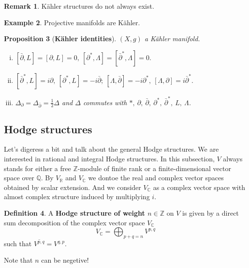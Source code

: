 \documentclass{article}
\theoremstyle{definition}
\newtheorem{definition}{Definition}[subsection]
\newtheorem{example}[definition]{Example}
\newtheorem{remark}[definition]{Remark}
\theoremstyle{plain}
\newtheorem{proposition}[definition]{Proposition}
\begin{document}
\begin{remark}
    K\"{a}hler structures do not always exist.
\end{remark}

\begin{example}
    Projective manifolds are K\"{a}hler.
\end{example}

\begin{proposition}[\textbf{K\"{a}hler identities}]
    $ (X,g) $ a K\"{a}hler manifold.\begin{enumerate}[(i)]
        \item $ [\bar{\partial},L]=[\partial,L]=0,\ [\partial^*,\varLambda]=[\bar{\partial}^*,\varLambda]=0. $
        \item $ [\bar{\partial}^*,L]=i\partial,\ [\partial^*,L]=-i\bar{\partial};\ [\varLambda,\bar{\partial}]=-i\partial^*,\ [\varLambda,\partial]=i\bar{\partial}^*. $
        \item $ \varDelta_{\partial}=\varDelta_{\bar{\partial}}=\frac{1}{2}\varDelta $ and $ \varDelta $ commutes with $ *,\ \partial,\ \bar{\partial},\ \partial^*,\ \bar{\partial}^*,\ L,\ \varLambda $.
    \end{enumerate}
\end{proposition}

\subsection{Hodge structures}

Let's digeress a bit and talk about the general Hodge structures. We are interested in rational and integral Hodge structures. In this subsection, $ V $ always stands for either a free $ \mathbb{Z} $-module of finite rank or a finite-dimensional vector space over $ \mathbb{Q} $. By $ V_{\mathbb{R}} $ and $ V_{\mathbb{C}} $ we dontoe the real and complex vector spaces obtained by scalar extension. And we consider $ V_{\mathbb{C}} $ as a complex vector space with almost complex structure induced by multiplying $ i $.

\begin{definition}
    A \textbf{Hodge structure of weight $ n\in \mathbb{Z} $} on $ V $ is given by a direct sum decomposition of the complex vector space $ V_{\mathbb{C}} $\[
        V_{\mathbb{C}}=\bigoplus_{p+q=n}V^{p,q}
    \]such that $ \overline{V^{p,q}}=V^{q,p} $.
\end{definition}

Note that $ n $ can be negetive!
\end{document}
